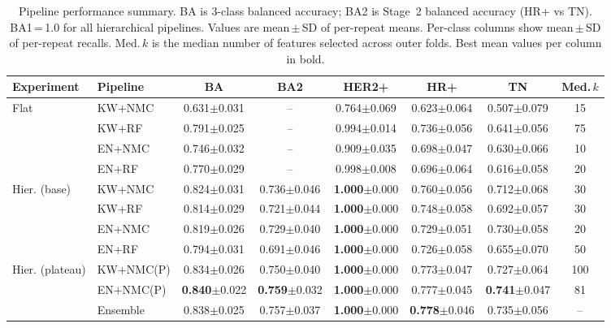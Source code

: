 \begin{table}[t]
\centering
\caption{Pipeline performance summary. BA is 3-class balanced accuracy; BA2 is Stage~2 balanced accuracy (HR+ vs TN). BA1\,=\,1.0 for all hierarchical pipelines. Values are mean\,$\pm$\,SD of per-repeat means. Per-class columns show mean\,$\pm$\,SD of per-repeat recalls. Med.\,$k$ is the median number of features selected across outer folds. Best mean values per column in bold.}
\label{tab:results}
\footnotesize
\setlength{\tabcolsep}{3.5pt}
\begin{tabular}{llcccccc}
\toprule
Experiment & Pipeline & BA & BA2 & HER2+ & HR+ & TN & Med.\,$k$ \\
\midrule
  Flat & KW+NMC & 0.631$\pm$0.031 & -- & 0.764$\pm$0.069 & 0.623$\pm$0.064 & 0.507$\pm$0.079 & 15 \\
   & KW+RF & 0.791$\pm$0.025 & -- & 0.994$\pm$0.014 & 0.736$\pm$0.056 & 0.641$\pm$0.056 & 75 \\
   & EN+NMC & 0.746$\pm$0.032 & -- & 0.909$\pm$0.035 & 0.698$\pm$0.047 & 0.630$\pm$0.066 & 10 \\
   & EN+RF & 0.770$\pm$0.029 & -- & 0.998$\pm$0.008 & 0.696$\pm$0.064 & 0.616$\pm$0.058 & 20 \\
\midrule
  Hier. (base) & KW+NMC & 0.824$\pm$0.031 & 0.736$\pm$0.046 & \textbf{1.000}$\pm$0.000 & 0.760$\pm$0.056 & 0.712$\pm$0.068 & 30 \\
   & KW+RF & 0.814$\pm$0.029 & 0.721$\pm$0.044 & \textbf{1.000}$\pm$0.000 & 0.748$\pm$0.058 & 0.692$\pm$0.057 & 30 \\
   & EN+NMC & 0.819$\pm$0.026 & 0.729$\pm$0.040 & \textbf{1.000}$\pm$0.000 & 0.729$\pm$0.051 & 0.730$\pm$0.058 & 20 \\
   & EN+RF & 0.794$\pm$0.031 & 0.691$\pm$0.046 & \textbf{1.000}$\pm$0.000 & 0.726$\pm$0.058 & 0.655$\pm$0.070 & 50 \\
\midrule
  Hier. (plateau) & KW+NMC(P) & 0.834$\pm$0.026 & 0.750$\pm$0.040 & \textbf{1.000}$\pm$0.000 & 0.773$\pm$0.047 & 0.727$\pm$0.064 & 100 \\
   & EN+NMC(P) & \textbf{0.840}$\pm$0.022 & \textbf{0.759}$\pm$0.032 & \textbf{1.000}$\pm$0.000 & 0.777$\pm$0.045 & \textbf{0.741}$\pm$0.047 & 81 \\
   & Ensemble & 0.838$\pm$0.025 & 0.757$\pm$0.037 & \textbf{1.000}$\pm$0.000 & \textbf{0.778}$\pm$0.046 & 0.735$\pm$0.056 & -- \\
\bottomrule
\end{tabular}
\end{table}
